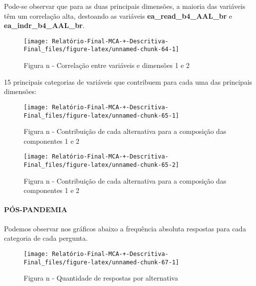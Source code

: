\documentclass[
]{article}
\begin{document}
Pode-se observar que para as duas principais dimensões, a maioria das
variáveis têm um correlação alta, destoando as variáveis
\textbf{ea\_read\_b4\_AAL\_br} e \textbf{ea\_indr\_b4\_AAL\_br}.

\begin{figure}

{\centering \texttt{[image: Relatório-Final-MCA-+-Descritiva-Final\_files/figure-latex/unnamed-chunk-64-1]} 

}

\caption{Figura n - Correlação entre variáveis e dimensões 1 e 2}\label{fig:unnamed-chunk-64}
\end{figure}

15 principais categorias de variáveis que contribuem para cada uma das
principais dimensões:

\begin{figure}

{\centering \texttt{[image: Relatório-Final-MCA-+-Descritiva-Final\_files/figure-latex/unnamed-chunk-65-1]} 

}

\caption{Figura n - Contribuição de cada alternativa para a composição das componentes 1 e 2}\label{fig:unnamed-chunk-65-1}
\end{figure}
\begin{figure}

{\centering \texttt{[image: Relatório-Final-MCA-+-Descritiva-Final\_files/figure-latex/unnamed-chunk-65-2]} 

}

\caption{Figura n - Contribuição de cada alternativa para a composição das componentes 1 e 2}\label{fig:unnamed-chunk-65-2}
\end{figure}

\hypertarget{puxf3s-pandemia-2}{%
\paragraph{\texorpdfstring{\textbf{PÓS-PANDEMIA}}{PÓS-PANDEMIA}}\label{puxf3s-pandemia-2}}

Podemos observar nos gráficos abaixo a frequência absoluta respostas
para cada categoria de cada pergunta.

\begin{figure}

{\centering \texttt{[image: Relatório-Final-MCA-+-Descritiva-Final\_files/figure-latex/unnamed-chunk-67-1]} 

}

\caption{Figura n - Quantidade de respostas por alternativa}\label{fig:unnamed-chunk-67}
\end{figure}
\end{document}
